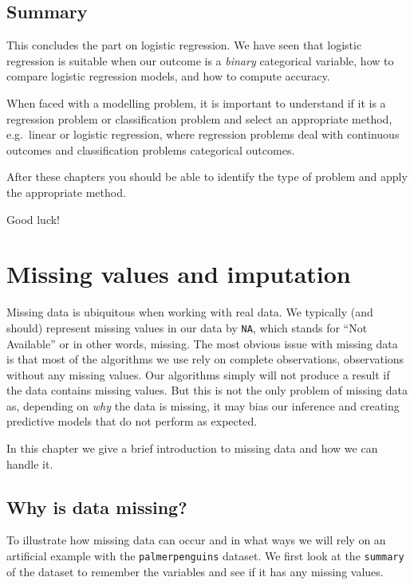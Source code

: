 \documentclass[
  letterpaper,
  DIV=11,
  numbers=noendperiod]{scrreprt}
\begin{document}
\section{Summary}\label{summary-2}

This concludes the part on logistic regression. We have seen that
logistic regression is suitable when our outcome is a \emph{binary}
categorical variable, how to compare logistic regression models, and how
to compute accuracy.

When faced with a modelling problem, it is important to understand if it
is a regression problem or classification problem and select an
appropriate method, e.g.~linear or logistic regression, where regression
problems deal with continuous outcomes and classification problems
categorical outcomes.

After these chapters you should be able to identify the type of problem
and apply the appropriate method.

Good luck!

\chapter{Missing values and imputation}\label{sec-missing}

Missing data is ubiquitous when working with real data. We typically
(and should) represent missing values in our data by \texttt{NA}, which
stands for ``Not Available'' or in other words, missing. The most
obvious issue with missing data is that most of the algorithms we use
rely on complete observations, observations without any missing values.
Our algorithms simply will not produce a result if the data contains
missing values. But this is not the only problem of missing data as,
depending on \emph{why} the data is missing, it may bias our inference
and creating predictive models that do not perform as expected.

In this chapter we give a brief introduction to missing data and how we
can handle it.

\section{Why is data missing?}\label{why-is-data-missing}

To illustrate how missing data can occur and in what ways we will rely
on an artificial example with the \texttt{palmerpenguins} dataset. We
first look at the \texttt{summary} of the dataset to remember the
variables and see if it has any missing values.
\end{document}
